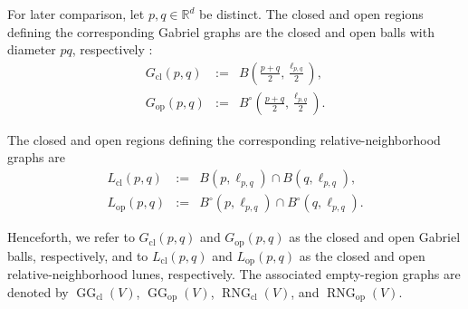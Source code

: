 \documentclass[a4paper,fleqn]{cas-dc}
\theoremstyle{definition}
\theoremstyle{remark}
\newcommand{\R}{\mathds{R}}
\newcommand{\ellpq}{\ell_{p,q}}
\newcommand{\0}{\mathbf{0}}
\newcommand{\tb}[1]{\textcolor[HTML]{0000bb}{#1}}
\DeclareMathOperator{\RNG}{RNG}
\DeclareMathOperator{\GG}{GG}
\DeclareMathOperator{\G}{G}
\begin{document}
For later comparison, let $p,q\in\R^d$ be distinct. The closed and open
regions defining the corresponding Gabriel graphs are the closed and open
balls with diameter $pq$, respectively
\citep{gabriel1969statistical,matula1980properties}:
\begin{eqnarray}
G_{\mathrm{cl}}(p,q)
&:=&
B\!\left(\frac{p+q}{2},\frac{\ellpq}{2}\right),\\
G_{\mathrm{op}}(p,q)
&:=&
B^\circ\!\left(\frac{p+q}{2},\frac{\ellpq}{2}\right).
\end{eqnarray}

The closed and open regions defining the corresponding
relative-neighborhood graphs are
\citep{toussaint1980relative,jaromczyk1992relative}
\begin{eqnarray}
L_{\mathrm{cl}}(p,q)
&:=&
B(p,\ellpq)\cap B(q,\ellpq),\\
L_{\mathrm{op}}(p,q)
&:=&
B^\circ(p,\ellpq)\cap B^\circ(q,\ellpq).
\end{eqnarray}

Henceforth, we refer to $G_{\mathrm{cl}}(p,q)$ and
$G_{\mathrm{op}}(p,q)$ as the closed and open Gabriel balls, respectively,
and to $L_{\mathrm{cl}}(p,q)$ and $L_{\mathrm{op}}(p,q)$ as the closed and
open relative-neighborhood lunes, respectively. 
The associated
empty-region graphs are denoted by
$\GG_{\mathrm{cl}}(V)$, $\GG_{\mathrm{op}}(V)$,
$\RNG_{\mathrm{cl}}(V)$, and $\RNG_{\mathrm{op}}(V)$.


\end{document}
